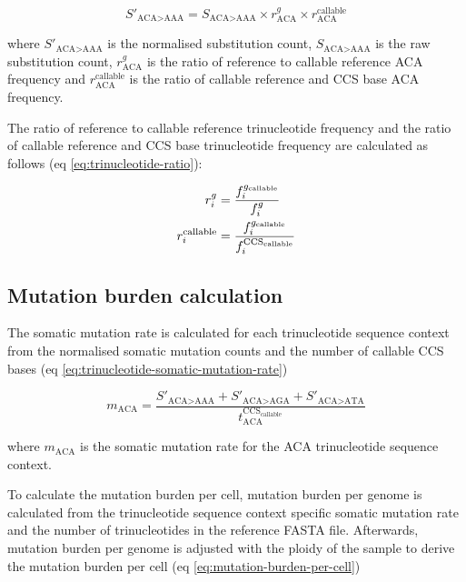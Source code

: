 \begin{equation} \label{eq:sbs96-normalisation}
S'_{\text{ACA>AAA}} = S_{\text{ACA>AAA}} \times r^{g}_{\text{ACA}} \times r^{\text{callable}}_{\text{ACA}} 
\end{equation}

where $S'_{\text{ACA>AAA}}$ is the normalised substitution count, $S_{\text{ACA>AAA}}$ is the raw substitution count, $r^{g}_{\text{ACA}}$ is the ratio of reference to callable reference ACA frequency and $r^{\text{callable}}_{\text{ACA}}$ is the ratio of callable reference and CCS base ACA frequency. 

The ratio of reference to callable reference trinucleotide frequency and the ratio of callable reference and CCS base trinucleotide frequency are calculated as follows (eq \ref{eq:trinucleotide-ratio}):

\begin{equation}
\begin{aligned} 
r^{g}_{i} &= \frac{f^{g_{\text{callable}}}_{i}}{f^{g}_{i}} \\ \smallskip
r^{\text{callable}}_{i} &= \frac{f^{g_{\text{callable}}}_{i}}{f^{\text{CCS}_{\text{callable}}}_{i}}
\end{aligned}
\label{eq:trinucleotide-ratio}
\end{equation}

\subsection{Mutation burden calculation}

The somatic mutation rate is calculated for each trinucleotide sequence context from the normalised somatic mutation counts and the number of callable CCS bases (eq \ref{eq:trinucleotide-somatic-mutation-rate})

\begin{equation} \label{eq:trinucleotide-somatic-mutation-rate}
m_{\text{ACA}} = \frac{S'_{\text{ACA>AAA}} + S'_{\text{ACA>AGA}} + S'_{\text{ACA>ATA}}}{t^{\text{CCS}_{\text{callable}}}_{\text{ACA}}} 
\end{equation}

where $m_{\text{ACA}}$ is the somatic mutation rate for the ACA trinucleotide sequence context. 

To calculate the mutation burden per cell, mutation burden per genome is calculated from the trinucleotide sequence context specific somatic mutation rate and the number of trinucleotides in the reference FASTA file. Afterwards, mutation burden per genome is adjusted with the ploidy of the sample to derive the mutation burden per cell (eq \ref{eq:mutation-burden-per-cell})


